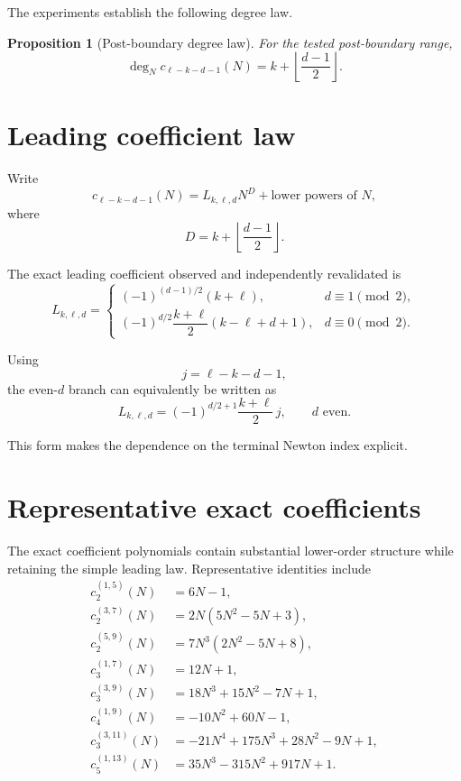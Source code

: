 \documentclass[11pt,a4paper]{article}
\newtheorem{proposition}{Proposition}
\begin{document}
The experiments establish the following degree law.

\begin{proposition}[Post-boundary degree law]
For the tested post-boundary range,
\begin{equation}
\boxed{
\deg_N c_{\ell-k-d-1}(N)
=
 k+\left\lfloor\frac{d-1}{2}\right\rfloor.
}
\end{equation}
\end{proposition}

\section{Leading coefficient law}

Write
\begin{equation}
c_{\ell-k-d-1}(N)
=L_{k,\ell,d}N^D+\text{lower powers of }N,
\end{equation}
where
\[
D=k+\left\lfloor\frac{d-1}{2}\right\rfloor.
\]

The exact leading coefficient observed and independently revalidated is
\begin{equation}
\boxed{
L_{k,\ell,d}=
\begin{cases}
(-1)^{(d-1)/2}(k+\ell), & d\equiv1\pmod 2,\\[6pt]
(-1)^{d/2}\dfrac{k+\ell}{2}
(k-\ell+d+1), & d\equiv0\pmod 2.
\end{cases}
}
\end{equation}

Using
\[
j=\ell-k-d-1,
\]
the even-$d$ branch can equivalently be written as
\begin{equation}
\boxed{
L_{k,\ell,d}
=
(-1)^{d/2+1}\frac{k+\ell}{2}\,j,
\qquad d\text{ even}.
}
\end{equation}

This form makes the dependence on the terminal Newton index explicit.

\section{Representative exact coefficients}

The exact coefficient polynomials contain substantial lower-order structure while retaining the simple leading law. Representative identities include
\begin{align}
c_2^{(1,5)}(N)&=6N-1,\\
c_2^{(3,7)}(N)&=2N(5N^2-5N+3),\\
c_2^{(5,9)}(N)&=7N^3(2N^2-5N+8),\\
c_3^{(1,7)}(N)&=12N+1,\\
c_3^{(3,9)}(N)&=18N^3+15N^2-7N+1,\\
c_4^{(1,9)}(N)&=-10N^2+60N-1,\\
c_3^{(3,11)}(N)&=-21N^4+175N^3+28N^2-9N+1,\\
c_5^{(1,13)}(N)&=35N^3-315N^2+917N+1.
\end{align}
\end{document}
